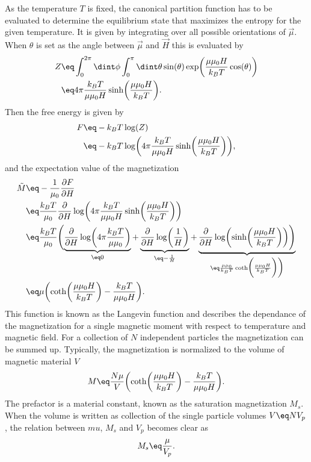 \documentclass[\main/dresen_thesis.tex]{subfiles}
\begin{document}
As the temperature $T$ is fixed, the canonical partition function has to be evaluated to determine the equilibrium state that maximizes the entropy for the given temperature.
It is given by integrating over all possible orientations of $\vec{\mu}$.
When $\theta$ is set as the angle between $\vec{\mu}$ and $\vec{H}$ this is evaluated by
\begin{align}
  Z \eq& \int_0^{2\pi} \dint \phi \int_0^\pi \dint \theta \sin(\theta) \exp \biggl(\frac{\mu \mu_0 H}{k_B T} \cos(\theta) \biggr)\\
  \eq& 4 \pi \frac{k_B T}{ \mu \mu_0 H} \sinh \biggl( \frac{\mu \mu_0 H}{k_B T} \biggr).
\end{align}
Then the free energy is given by
\begin{align}
  F \eq& -k_B T \log(Z)\\
  \eq& -k_B T \log \biggl( 4 \pi \frac{k_B T}{ \mu \mu_0 H}  \sinh \biggl( \frac{\mu \mu_0 H}{k_B T} \biggr) \biggr),
\end{align}
and the expectation value of the magnetization
\begin{align}
  \tilde{M} \eq& - \frac{1}{\mu_0 } \frac{\partial F}{\partial H}\\
  \eq& \frac{k_B T}{\mu_0 } \frac{\partial}{\partial H} \log \biggl( 4 \pi \frac{k_B T}{ \mu \mu_0 H}  \sinh \biggl( \frac{\mu \mu_0 H}{k_B T} \biggr) \biggr)\\
  \eq& \frac{k_B T}{\mu_0 } \Biggl(
    \underbrace{\frac{\partial}{\partial H} \log \biggl( 4 \pi \frac{k_B T}{ \mu \mu_0} \biggr)}_{\eq 0}
  + \underbrace{\frac{\partial}{\partial H} \log \biggl( \frac{1}{H} \biggr)}_{\eq - \frac{1}{H}}
  + \underbrace{\frac{\partial}{\partial H}\log  \biggl(  \sinh \biggl( \frac{\mu \mu_0 H}{k_B T} \biggr) \biggr) \Biggr)}_{\eq \frac{\mu \mu_0}{k_B T} \coth \biggl( \frac{\mu \mu_0 H}{k_B T} \biggr) \biggr)}\\
  \eq& \mu \biggl(\coth \biggl( \frac{\mu \mu_0 H}{k_B T} \biggr) - \frac{k_B T}{\mu \mu_0 H} \biggr).
\end{align}
This function is known as the Langevin function and describes the dependance of the magnetization for a single magnetic moment with respect to temperature and magnetic field.
For a collection of $N$ independent particles the magnetization can be summed up.
Typically, the magnetization is normalized to the volume of magnetic material $V$
\begin{align}
  M \eq \frac{N \mu}{V} \biggl(\coth \biggl( \frac{\mu \mu_0 H}{k_B T} \biggr) - \frac{k_B T}{\mu \mu_0 H} \biggr).
\end{align}
The prefactor is a material constant, known as the saturation magnetization $M_s$.
When the volume is written as collection of the single particle volumes $V \eq N V_p$, the relation between $mu$, $M_s$ and $V_p$ becomes clear as
\begin{align}
  M_s \eq \frac{\mu}{V_p}.
\end{align}
\end{document}
